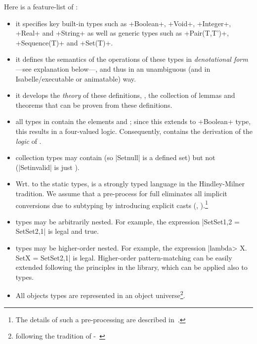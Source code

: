 Here is a feature-list of  \FOCL:
\begin{itemize}
 \item it specifies key built-in types such as \inlineocl+Boolean+,
         \inlineocl+Void+, \inlineocl+Integer+, \inlineocl+Real+ and 
         \inlineocl+String+ as well as generic types such as 
         \inlineocl+Pair(T,T')+, \inlineocl+Sequence(T)+ and \inlineocl+Set(T)+.
 \item it defines the semantics of the operations of these types in 
         \emph{denotational form}---see explanation below---,
         and thus in an unambiguous (and in Isabelle/\HOL executable or 
         animatable) way.
       \item it develops the \emph{theory} of these definitions, \ie, the collection 
         of lemmas and theorems that can be proven from these definitions.
 \item all types in  \FOCL contain the elements  and ;
         since this extends to \inlineocl+Boolean+ type, this results
         in a four-valued logic. Consequently,  \FOCL contains
         the derivation of the \emph{logic} of \OCL.
 \item collection types may contain
          (so \inlineocl|Set{null}| is a defined set) but not
          (\inlineocl|Set{invalid}| is just
         ).
 \item Wrt. to the static types,  \FOCL is a strongly typed language in
         the Hindley-Milner tradition.
         We assume that a pre-process for full \OCL eliminates all implicit
         conversions due to subtyping by introducing explicit casts (\eg,
         ).\footnote{The details of such a 
         pre-processing are  described in~\cite{brucker:interactive:2007}.}
 \item  \FOCL types may be arbitrarily nested. For example,
         the expression
         \inlineocl|Set{Set{1,2}} = Set{Set{2,1}}| is legal and true.
 \item  \FOCL types may be higher-order nested. For example,
         the expression \inlineocl|\<lambda> X. Set{X} = Set{Set{2,1}}| is legal.
         Higher-order pattern-matching can be easily extended following 
         the principles in the \HOL library, which can be applied also to \FOCL types.
 \item All objects types are represented in an object universe\footnote{following
         the tradition of \HOL-\OCL~\cite{brucker.ea:extensible:2008-b}}.

\end{itemize}
